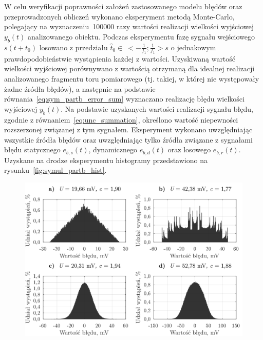 W celu weryfikacji poprawności założeń zastosowanego modelu błędów oraz przeprowadzonych obliczeń wykonano eksperyment metodą Monte-Carlo, polegający na wyznaczeniu~\num{100000} razy wartości realizacji wielkości wyjściowej $y_{b}(t)$ analizowanego obiektu. Podczas eksperymentu fazę sygnału wejściowego $s(t+t_{0})$ losowano z przedziału $\hat{t}_{0} \in~<-\frac{1}{f_{1}};\frac{1}{f_{1}}>\unit{s}$ o jednakowym prawdopodobieństwie wystąpienia każdej z wartości. Uzyskiwaną wartość wielkości wyjściowej porównywano z wartością otrzymaną dla idealnej realizacji analizowanego fragmentu toru pomiarowego (tj. takiej, w której nie występowały żadne źródła błędów), a następnie na podstawie równania~\eqref{eq:sym_partb_error_sum} wyznaczano realizację błędu wielkości wyjściowej $y_{b}(t)$. Na podstawie uzyskanych wartości realizacji sygnału błędu, zgodnie z równaniem~\eqref{eq:unc_summation}, określono wartość niepewności rozszerzonej związanej z tym sygnałem. Eksperyment wykonano uwzględniając wszystkie źródła błędów oraz uwzględniając tylko źródła związane z sygnałami błędu statycznego $e_{b,s}(t)$, dynamicznego $e_{b,d}(t)$ oraz losowego $e_{b,r}(t)$. Uzyskane na drodze eksperymentu histogramy przedstawiono na rysunku~\ref{fig:symul_partb_hist}.

\begin{figure}[htb!]
\begin{center}
\includegraphics{obrazki/hist_part_b}
\end{center}
\end{figure}

